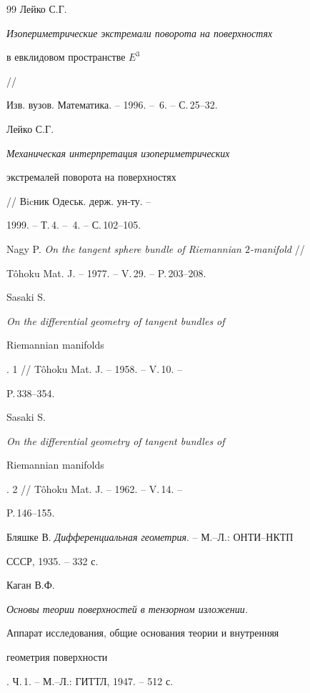 \begin{thebibliography}{99}
Лейко С.Г. {\em Изопериметрические экстремали поворота на поверхностях 


в евклидовом пространстве $E^3$} // 


Изв. вузов. Математика. -- 1996. -- \No\,6. -- С.\,25--32. 




Лейко С.Г. {\em Механическая интерпретация изопериметрических 


экстремалей поворота на поверхностях} // Вicник Одеськ. держ. ун-ту. -- 


1999. -- Т.\,4. -- \No\,4. -- С.\,102--105. 




Nagy P. {\em On the tangent sphere bundle of Riemannian $2$-manifold} // 


T\^ohoku Mat. J. -- 1977. -- V.\,29. -- P.\,203--208. 




Sasaki S. {\em On the differential geometry of tangent bundles of 


Riemannian manifolds}. 1 // T\^ohoku Mat. J. -- 1958. -- V.\,10. -- 


P.\,338--354. 




Sasaki S. {\em On the differential geometry of tangent bundles of 


Riemannian manifolds}. 2 // T\^ohoku Mat. J. -- 1962. -- V.\,14. -- 


P.\,146--155. 




Бляшке В. {\em Дифференциальная геометрия}. -- М.--Л.: ОНТИ--НКТП 


СССР, 1935. -- 332 с. 




Каган В.Ф. {\em Основы теории поверхностей в тензорном изложении. 


Аппарат исследования, общие основания теории и внутренняя 


геометрия поверхности}. Ч.\,1. -- М.--Л.: ГИТТЛ, 1947. -- 512 с. 


 


\end{thebibliography} 


 


\vskip 2cm 


 






 


\label{end} 


 


